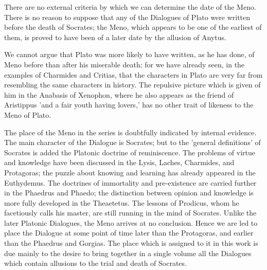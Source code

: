\documentclass[11pt,letter]{article}
\begin{document}
\par  There are no external criteria by which we can determine the date of the Meno. There is no reason to suppose that any of the Dialogues of Plato were written before the death of Socrates; the Meno, which appears to be one of the earliest of them, is proved to have been of a later date by the allusion of Anytus.

\par  We cannot argue that Plato was more likely to have written, as he has done, of Meno before than after his miserable death; for we have already seen, in the examples of Charmides and Critias, that the characters in Plato are very far from resembling the same characters in history. The repulsive picture which is given of him in the Anabasis of Xenophon, where he also appears as the friend of Aristippus 'and a fair youth having lovers,' has no other trait of likeness to the Meno of Plato.

\par  The place of the Meno in the series is doubtfully indicated by internal evidence. The main character of the Dialogue is Socrates; but to the 'general definitions' of Socrates is added the Platonic doctrine of reminiscence. The problems of virtue and knowledge have been discussed in the Lysis, Laches, Charmides, and Protagoras; the puzzle about knowing and learning has already appeared in the Euthydemus. The doctrines of immortality and pre-existence are carried further in the Phaedrus and Phaedo; the distinction between opinion and knowledge is more fully developed in the Theaetetus. The lessons of Prodicus, whom he facetiously calls his master, are still running in the mind of Socrates. Unlike the later Platonic Dialogues, the Meno arrives at no conclusion. Hence we are led to place the Dialogue at some point of time later than the Protagoras, and earlier than the Phaedrus and Gorgias. The place which is assigned to it in this work is due mainly to the desire to bring together in a single volume all the Dialogues which contain allusions to the trial and death of Socrates.

\par 
\end{document}
